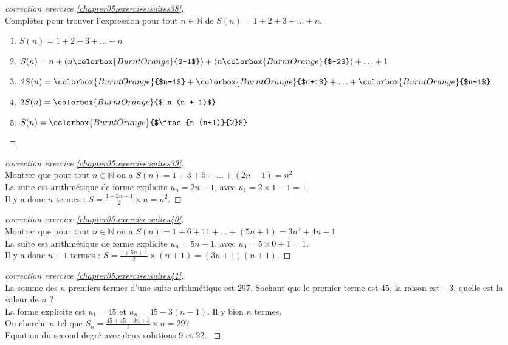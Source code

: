 \documentclass[main.tex]{subfiles}
\begin{document}
\begin{proof}[correction exercice \ref{chapter05:exercise:suites38}] \hfill \\
Compléter pour trouver l'expression pour tout $n\in\mathbb{N}$ de $S(n)=1+2+3+\ldots+n$. 
\begin{spacing}{2}
	\vspace{-0.5em}
	\begin{enumerate}[leftmargin=*,label={}]
		\item  $S(n)=1+2+3+\ldots + n$
		\item $S(n)= n + (n\colorbox{BurntOrange}{$-1$}) + (n\colorbox{BurntOrange}{$-2$}) + \ldots + 1$
		\item $2S(n)= \colorbox{BurntOrange}{$n+1$} + \colorbox{BurntOrange}{$n+1$}  + \ldots + \colorbox{BurntOrange}{$n+1$} $\dotfill 
		\item $2S(n)= \colorbox{BurntOrange}{$ n (n + 1)$} $
		\item $S(n)=\colorbox{BurntOrange}{$\frac{n (n+1)}{2}$} $
	\end{enumerate}
\end{spacing} 
\vspace{-0.75em}
\end{proof}
\begin{proof}[correction exercice \ref{chapter05:exercise:suites39}] \hfill \\
Montrer que pour tout $n\in\mathbb{N}$ on a $S(n)=1+3+5+\ldots + (2n-1)=n^2$\\
\colorbox{BurntOrange}{La suite est arithmétique de forme explicite $u_n=2n-1$, avec $u_1=2\times 1 -1= 1$.}\\
\colorbox{BurntOrange}{Il y a donc $n$ termes : $S=\frac{1+2n-1}{2}\times n=n^2$}.
\end{proof} 
\begin{proof}[correction exercice \ref{chapter05:exercise:suites40}] \hfill \\
	Montrer que pour tout $n\in\mathbb{N}$ on a $S(n)=1+6+11+\ldots + (5n+1)=3n^2+4n+1$%
	\\
	\colorbox{BurntOrange}{La suite est arithmétique de forme explicite $u_n=5n+1$, avec $u_0=5\times 0 +1= 1$.}\\
	\colorbox{BurntOrange}{Il y a donc $n+1$ termes : $S=\frac{1+5n+1}{2}\times (n+1)=(3n+1)(n+1)$}.
\end{proof}
\begin{proof}[correction exercice \ref{chapter05:exercise:suites41}]\hfill \\
	La somme des $n$ premiers termes d'une suite arithmétique est $297$. Sachant que le premier terme est $45$, la raison est $-3$, quelle est la valeur de $n$ ?\\
	\colorbox{BurntOrange}{La forme explicite est $u_1=45$ et $u_n=45-3(n-1)$. Il y bien $n$ termes.}\\
	\colorbox{BurntOrange}{On cherche $n$ tel que $S_n=\frac{45+45-3n+3}{2}\times n=297$}\\
	\colorbox{BurntOrange}{ Equation du second degré avec deux solutions $9$ et $22$. }
\end{proof} 
\end{document}
